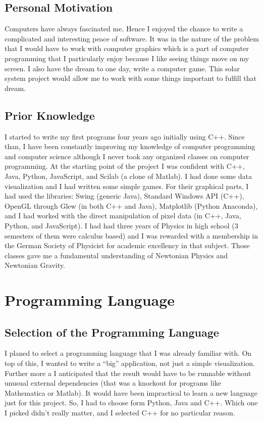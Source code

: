 \documentclass[a4paper,onesided,10pt]{article}
\begin{document}
\subsection{Personal Motivation}
Computers have always fascinated me. Hence I enjoyed the chance to write a complicated and interesting peace of software. It was in the nature of the problem that I would have to work with computer graphics which is a part of computer programming that I particularly enjoy because I like seeing things move on my screen. I also have the dream to one day, write a computer game. This solar system project would allow me to work with some things important to fulfill that dream.

\subsection{Prior Knowledge}
I started to write my first programs four years ago initially using C++. Since than, I have been constantly improving my knowledge of computer programming and computer science although I never took any organized classes on computer programming. At the starting point of the project I was confident with C++, Java, Python, JavaScript, and Scilab (a clone of Matlab). I had done some data visualization and I had written some simple games. For their graphical parts, I had used the libraries: Swing (generic Java), Standard Windows API (C++), OpenGL through Glew (in both C++ and Java), Matplotlib (Python Anaconda), and I had worked with the direct manipulation of pixel data (in C++, Java, Python, and JavaScript). I had had three years of Physics in high school (3 semesters of them were calculus based) and I was rewarded with a membership in the German Society of Physicist for academic excellency in that subject. Those classes gave me a fundamental understanding of Newtonian Physics and Newtonian Gravity.


\section{Programming Language}

\subsection{Selection of the Programming Language}
I planed to select a programming language that I was already familiar with. On top of this, I wanted to write a "`big"' application,  not just a simple visualization. Further more a I anticipated that the result would have to be runnable without unusual external dependencies (that was a knockout for programs like Mathematica or Matlab). It would have been impractical to learn a new language just for this project. So, I had to choose form Python, Java and C++. Which one I picked didn't really matter, and I selected C++ for no particular reason.
\end{document}
